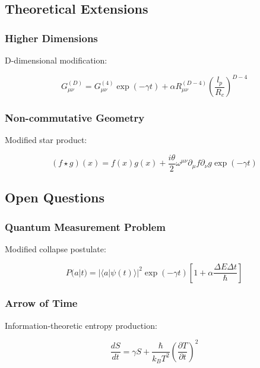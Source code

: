 \documentclass[12pt]{article}
\theoremstyle{plain}
\theoremstyle{definition}
\theoremstyle{remark}
\begin{document}
\subsection{Theoretical Extensions}

\subsubsection{Higher Dimensions}

D-dimensional modification:

\begin{equation}
G_{\mu\nu}^{(D)} = G_{\mu\nu}^{(4)}\exp(-\gamma t) + \alpha R_{\mu\nu}^{(D-4)}\left(\frac{l_p}{R_c}\right)^{D-4}
\end{equation}

\subsubsection{Non-commutative Geometry}

Modified star product:

\begin{equation}
(f \star g)(x) = f(x)g(x) + \frac{i\theta}{2}\omega^{\mu\nu}\partial_\mu f\partial_\nu g\exp(-\gamma t)
\end{equation}

\subsection{Open Questions}

\subsubsection{Quantum Measurement Problem}

Modified collapse postulate:

\begin{equation}
P(a|t) = |\langle a|\psi(t)\rangle|^2\exp(-\gamma t)\left[1 + \alpha\frac{\Delta E\Delta t}{\hbar}\right]
\end{equation}

\subsubsection{Arrow of Time}

Information-theoretic entropy production:

\begin{equation}
\frac{dS}{dt} = \gamma S + \frac{\hbar}{k_BT^2}\left(\frac{\partial T}{\partial t}\right)^2
\end{equation}
\end{document}
